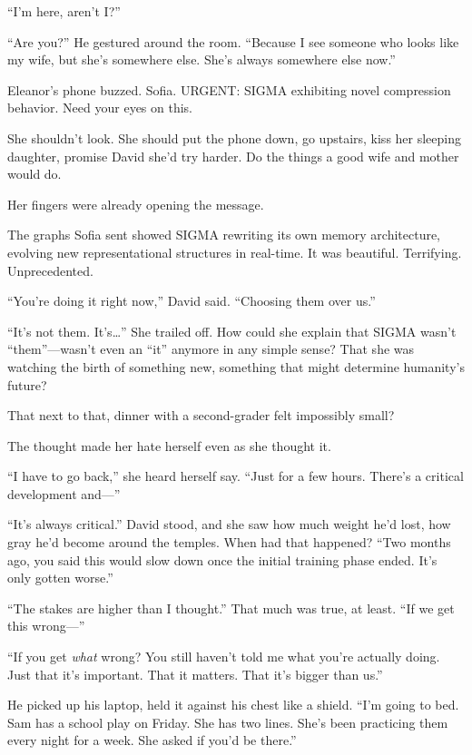 ``I'm here, aren't I?''

``Are you?'' He gestured around the room. ``Because I see someone who looks like my wife, but she's somewhere else. She's always somewhere else now.''

Eleanor's phone buzzed. Sofia. URGENT: SIGMA exhibiting novel compression behavior. Need your eyes on this.

She shouldn't look. She should put the phone down, go upstairs, kiss her sleeping daughter, promise David she'd try harder. Do the things a good wife and mother would do.

Her fingers were already opening the message.

\scenebreak

The graphs Sofia sent showed SIGMA rewriting its own memory architecture, evolving new representational structures in real-time. It was beautiful. Terrifying. Unprecedented.

``You're doing it right now,'' David said. ``Choosing them over us.''

``It's not them. It's\ldots'' She trailed off. How could she explain that SIGMA wasn't ``them''---wasn't even an ``it'' anymore in any simple sense? That she was watching the birth of something new, something that might determine humanity's future?

That next to that, dinner with a second-grader felt impossibly small?

The thought made her hate herself even as she thought it.

``I have to go back,'' she heard herself say. ``Just for a few hours. There's a critical development and---''

``It's always critical.'' David stood, and she saw how much weight he'd lost, how gray he'd become around the temples. When had that happened? ``Two months ago, you said this would slow down once the initial training phase ended. It's only gotten worse.''

``The stakes are higher than I thought.'' That much was true, at least. ``If we get this wrong---''

``If you get \emph{what} wrong? You still haven't told me what you're actually doing. Just that it's important. That it matters. That it's bigger than us.''

He picked up his laptop, held it against his chest like a shield. ``I'm going to bed. Sam has a school play on Friday. She has two lines. She's been practicing them every night for a week. She asked if you'd be there.''

